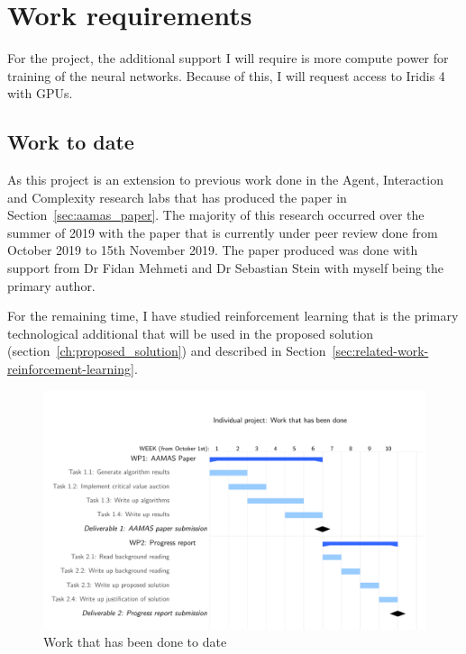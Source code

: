 \chapter{Work requirements}\label{ch:work-requirements}
For the project, the additional support I will require is more compute power for training of the neural networks. Because of this,
I will request access to Iridis 4 with GPUs.

\section{Work to date}\label{sec:work-to-date}
As this project is an extension to previous work done in the Agent, Interaction and Complexity research labs that has
produced the paper in Section~\ref{sec:aamas_paper}. The majority of this research occurred over the summer of 2019
with the paper that is currently under peer review done from October 2019 to 15th November 2019. The paper produced
was done with support from Dr Fidan Mehmeti and Dr Sebastian Stein with myself being the primary author.

For the remaining time, I have studied reinforcement learning that is the primary technological additional that will
be used in the proposed solution (section~\ref{ch:proposed_solution}) and described in
Section~\ref{sec:related-work-reinforcement-learning}.

\begin{figure}[ht]
    \centering
    \includegraphics[width=\linewidth]{past_work_grantt/past_grantt.pdf}
    \caption{Work that has been done to date}
    \label{fig:past_grantt}
\end{figure}

